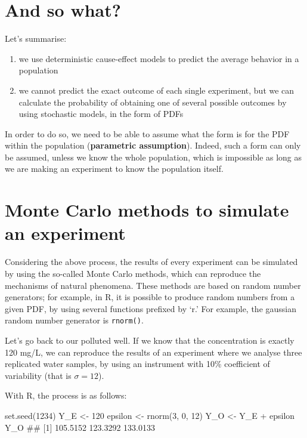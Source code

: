 \documentclass[a4paper,12pt,oneside]{book}
\providecommand{\tightlist}{%
  \setlength{\itemsep}{0pt}\setlength{\parskip}{0pt}}
\newenvironment{Shaded}{\begin{snugshade}}{\end{snugshade}}
\newcommand{\DecValTok}[1]{#1}
\newcommand{\SpecialCharTok}[1]{#1}
\newcommand{\DocumentationTok}[1]{#1}
\newcommand{\OtherTok}[1]{#1}
\newcommand{\FunctionTok}[1]{#1}
\newcommand{\NormalTok}[1]{#1}
\begin{document}
\hypertarget{and-so-what}{%
\section{And so what?}\label{and-so-what}}

Let's summarise:

\begin{enumerate}
\def\labelenumi{\arabic{enumi}.}
\tightlist
\item
  we use deterministic cause-effect models to predict the average behavior in a population
\item
  we cannot predict the exact outcome of each single experiment, but we can calculate the probability of obtaining one of several possible outcomes by using stochastic models, in the form of PDFs
\end{enumerate}

In order to do so, we need to be able to assume what the form is for the PDF within the population (\textbf{parametric assumption}). Indeed, such a form can only be assumed, unless we know the whole population, which is impossible as long as we are making an experiment to know the population itself.

\hypertarget{monte-carlo-methods-to-simulate-an-experiment}{%
\section{Monte Carlo methods to simulate an experiment}\label{monte-carlo-methods-to-simulate-an-experiment}}

Considering the above process, the results of every experiment can be simulated by using the so-called Monte Carlo methods, which can reproduce the mechanisms of natural phenomena. These methods are based on random number generators; for example, in R, it is possible to produce random numbers from a given PDF, by using several functions prefixed by `r.' For example, the gaussian random number generator is \texttt{rnorm()}.

Let's go back to our polluted well. If we know that the concentration is exactly 120 mg/L, we can reproduce the results of an experiment where we analyse three replicated water samples, by using an instrument with 10\% coefficient of variability (that is \(\sigma = 12\)).

With R, the process is as follows:

\begin{Shaded}
\begin{Highlighting}[]
\FunctionTok{set.seed}\NormalTok{(}\DecValTok{1234}\NormalTok{)}
\NormalTok{Y\_E }\OtherTok{\textless{}{-}} \DecValTok{120}
\NormalTok{epsilon }\OtherTok{\textless{}{-}} \FunctionTok{rnorm}\NormalTok{(}\DecValTok{3}\NormalTok{, }\DecValTok{0}\NormalTok{, }\DecValTok{12}\NormalTok{)}
\NormalTok{Y\_O }\OtherTok{\textless{}{-}}\NormalTok{ Y\_E }\SpecialCharTok{+}\NormalTok{ epsilon}
\NormalTok{Y\_O}
\DocumentationTok{\#\# [1] 105.5152 123.3292 133.0133}
\end{Highlighting}
\end{Shaded}
\end{document}
